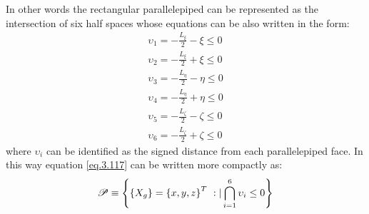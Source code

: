  In other words the rectangular parallelepiped can be represented as the intersection of six half spaces whose equations can be also written in the form:
  \begin{eqnarray}
  \upsilon_1=-\frac{L_\xi}{2}-\xi\leq 0\\
    \upsilon_2=-\frac{L_\xi}{2}+\xi\leq 0\\
      \upsilon_3=-\frac{L_\eta}{2}-\eta\leq 0\\
     \upsilon_4= -\frac{L_\eta}{2}+\eta\leq 0\\
        \upsilon_5=-\frac{L_\zeta}{2}-\zeta\leq 0\\
        \upsilon_6=-\frac{L_\zeta}{2}+\zeta\leq 0
  \end{eqnarray}
  where $\upsilon_i$ can be identified as the signed distance from each parallelepiped face. In this way equation \ref{eq.3.117} can be written more compactly as:
  \begin{equation}
    \label{eq.3.124}
    \mathscr{P}\equiv\left\lbrace{\ensuremath\left\lbrace{X_g}\right \rbrace=\ensuremath\left\lbrace{x,y,z}\right \rbrace^T\ :| \bigcap_{i=1}^6{\upsilon_i\leq 0}}\right \rbrace
    \end{equation}

